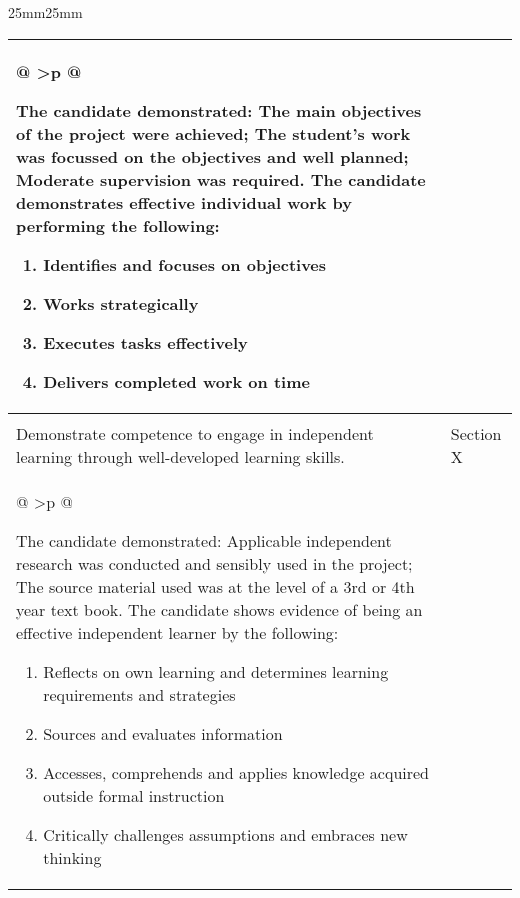 {\begin{USS@SetMargins}{25mm}{25mm}
\begin{longtable}{@{\extracolsep{\fill}}| >{\raggedright}p{} | >{\raggedright\noindent\arraybackslash}p{32mm} |}
			\nobreakhline
			\multicolumn{2}
			{@{\hspace{\fill}} >{\small\normalfont\justifying}p{\textwidth} @{\hspace{\fill}}}{
				\par The candidate demonstrated: The main objectives of the project were achieved; The student's work was focussed on the objectives and well planned; Moderate supervision was required. The candidate demonstrates effective individual work by performing the following:
				\begin{enumerate}
					\item Identifies and focuses on objectives
					\item Works strategically
					\item Executes tasks effectively
					\item Delivers completed work on time
				\end{enumerate}
				\par}                                                                                                                                                                    \\
			\hline
			\multicolumn{2}{|>{\small\sffamily\bfseries\columncolor[gray]{.8}}c|}{\capitalisewords{ELO 9: Independent Learning Ability}}                                             \\
			\nobreakhline
			Demonstrate competence to engage in independent learning through well-developed learning skills.                                                                 & \textbullet \space Section X \\
			\nobreakhline
			\multicolumn{2}
			{@{\hspace{\fill}} >{\small\normalfont\justifying}p{\textwidth} @{\hspace{\fill}}}{
				\par The candidate demonstrated: Applicable independent research was conducted and sensibly used in the project; The source material used was at the level of a 3rd or 4th year text book. The candidate shows evidence of being an effective independent learner by the following:
				\begin{enumerate}
					\item Reflects on own learning and determines learning requirements and strategies
					\item Sources and evaluates information
					\item Accesses, comprehends and applies knowledge acquired outside formal instruction
					\item Critically challenges assumptions and embraces new thinking
				\end{enumerate}
				\par}
		\end{longtable}
	\end{USS@SetMargins}
	\clearpage
}
\makeatother


